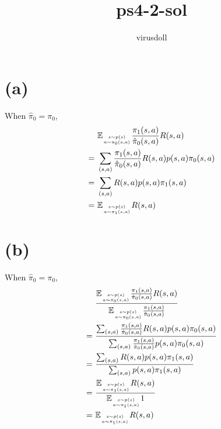 \documentclass[11pt, a4paper]{article}
\title{ps4-2-sol}
\author{virusdoll}
\begin{document}
    \maketitle
    
    \section*{(a)}
    When $\hat{\pi}_0 = \pi_0$,
    \begin{align*}
        & \ \mathbb{E}_{\genfrac{}{}{0pt}{2}{s \sim p(s)}{a \sim \pi_0(s,a)}}
        \frac{\pi_1 (s, a)}{\hat{\pi}_0 (s,a)} R(s,a) \\
        = & \ \sum_{(s,a)} \frac{\pi_1 (s, a)}{\hat{\pi}_0 (s,a)} R(s,a) p(s,a) \pi_0(s,a) \\
        = & \ \sum_{(s,a)} R(s,a) p(s,a) \pi_1(s,a) \\
        = & \ \mathbb{E}_{\genfrac{}{}{0pt}{2}{s \sim p(s)}{a \sim \pi_1(s,a)}} R(s,a)
    \end{align*}

    \section*{(b)}
    When $\hat{\pi}_0 = \pi_0$,
    \begin{align*}
        & \ \frac{
            \mathbb{E}_{\genfrac{}{}{0pt}{2}{s \sim p(s)}{a \sim \pi_0(s,a)}}
            \frac{\pi_1 (s, a)}{\hat{\pi}_0 (s,a)} R(s,a)
        }{
            \mathbb{E}_{\genfrac{}{}{0pt}{2}{s \sim p(s)}{a \sim \pi_0(s,a)}}
            \frac{\pi_1 (s, a)}{\hat{\pi}_0 (s,a)}
        } \\
        = & \ \frac{
            \sum_{(s,a)} \frac{\pi_1 (s, a)}{\hat{\pi}_0 (s,a)} R(s,a) p(s,a) \pi_0(s,a)
        }{
            \sum_{(s,a)} \frac{\pi_1 (s, a)}{\hat{\pi}_0 (s,a)} p(s,a) \pi_0(s,a)
        } \\
        = & \ \frac{
            \sum_{(s,a)} R(s,a) p(s,a) \pi_1(s,a)
        }{
            \sum_{(s,a)} p(s,a) \pi_1(s,a)
        } \\
        = & \ \frac{
            \mathbb{E}_{\genfrac{}{}{0pt}{2}{s \sim p(s)}{a \sim \pi_1(s,a)}} R(s,a)
        }{
            \mathbb{E}_{\genfrac{}{}{0pt}{2}{s \sim p(s)}{a \sim \pi_1(s,a)}} 1
        } \\
        = & \ \mathbb{E}_{\genfrac{}{}{0pt}{2}{s \sim p(s)}{a \sim \pi_1(s,a)}} R(s,a)
    \end{align*}
\end{document}
